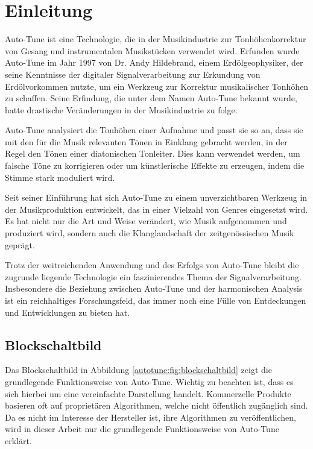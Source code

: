 %
%
%
%
\section{Einleitung\label{autotune:section:teil0}}
Auto-Tune ist eine Technologie, die in der Musikindustrie zur Tonhöhenkorrektur von Gesang und instrumentalen Musikstücken verwendet wird.
Erfunden wurde Auto-Tune im Jahr 1997 von Dr. Andy Hildebrand, einem Erdölgeophysiker,
der seine Kenntnisse der digitaler Signalverarbeitung zur Erkundung von Erdölvorkommen nutzte,
um ein Werkzeug zur Korrektur musikalischer Tonhöhen zu schaffen.
Seine Erfindung, die unter dem Namen Auto-Tune bekannt wurde, hatte drastische Veränderungen in der Musikindustrie zu folge.

Auto-Tune analysiert die Tonhöhen einer Aufnahme und passt sie so an, dass sie mit den für die Musik relevanten Tönen in Einklang gebracht werden,
in der Regel den Tönen einer diatonischen Tonleiter.
Dies kann verwendet werden, um falsche Töne zu korrigieren oder um künstlerische Effekte zu erzeugen, indem die Stimme stark moduliert wird.

Seit seiner Einführung hat sich Auto-Tune zu einem unverzichtbaren Werkzeug in der Musikproduktion entwickelt,
das in einer Vielzahl von Genres eingesetzt wird.
Es hat nicht nur die Art und Weise verändert, wie Musik aufgenommen und produziert wird,
sondern auch die Klanglandschaft der zeitgenössischen Musik geprägt.

Trotz der weitreichenden Anwendung und des Erfolgs von Auto-Tune bleibt die zugrunde liegende Technologie ein faszinierendes Thema der Signalverarbeitung.
Insbesondere die Beziehung zwischen Auto-Tune und der harmonischen Analysis ist ein reichhaltiges Forschungsfeld,
das immer noch eine Fülle von Entdeckungen und Entwicklungen zu bieten hat.


\subsection{Blockschaltbild
\label{autotune:subsection:blockschaltbild}}
Das Blockschaltbild in Abbildung \ref{autotune:fig:blockschaltbild} zeigt die grundlegende Funktionsweise von Auto-Tune.
Wichtig zu beachten ist, dass es sich hierbei um eine vereinfachte Darstellung handelt.
Kommerzelle Produkte basieren oft auf proprietären Algorithmen, welche nicht öffentlich zugänglich sind.
Da es nicht im Interesse der Hersteller ist, ihre Algorithmen zu veröffentlichen,
wird in dieser Arbeit nur die grundlegende Funktionsweise von Auto-Tune erklärt.

